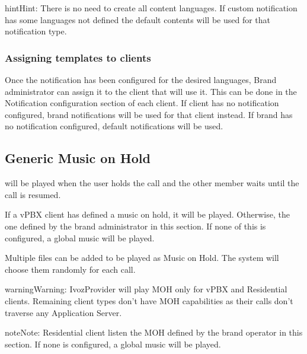\documentclass[letterpaper,10pt,english]{sphinxmanual}
\begin{document}
\begin{notice}{hint}{Hint:}
There is no need to create all content languages. If custom notification has some languages not defined the
default contents will be used for that notification type.
\end{notice}


\subsubsection{Assigning templates to clients}
\label{administration_portal/brand/settings/notification_templates:assigning-templates-to-clients}
Once the notification has been configured for the desired languages, Brand administrator can assign it to the
client that will use it. This can be done in the Notification configuration section of each client.
If client has no notification configured, brand notifications will be used for that client instead. If brand has no
notification configured, default notifications will be used.


\subsection{Generic Music on Hold}
\label{administration_portal/brand/settings/generic_music_on_hold:generic-music-on-hold}\label{administration_portal/brand/settings/generic_music_on_hold::doc}
{\hyperref[administration_portal/client/vpbx/multimedia/music_on_hold:music\string-on\string-hold]{}} will be played when the user holds the call and the other
member waits until the call is resumed.

If a vPBX client has defined a music on hold, it will be played. Otherwise, the
one defined by the brand administrator in this section. If none of this is configured,
a global music will be played.

Multiple files can be added to be played as Music on Hold. The system will choose them randomly for each call.

\begin{notice}{warning}{Warning:}
IvozProvider will play MOH only for vPBX and Residential clients. Remaining client
types don't have MOH capabilities as their calls don't traverse any Application Server.
\end{notice}

\begin{notice}{note}{Note:}
Residential client listen the MOH defined by the brand operator in this section. If none is configured,
a global music will be played.
\end{notice}
\end{document}
